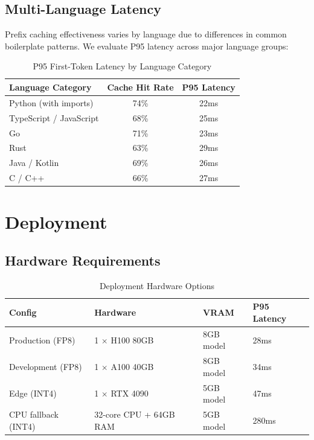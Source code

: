 \documentclass[11pt,a4paper]{article}
\begin{document}
\subsection{Multi-Language Latency}

Prefix caching effectiveness varies by language due to differences in common boilerplate patterns. We evaluate P95 latency across major language groups:

\begin{table}[H]
\centering
\caption{P95 First-Token Latency by Language Category}
\begin{tabular}{lcc}
\toprule
\textbf{Language Category} & \textbf{Cache Hit Rate} & \textbf{P95 Latency} \\
\midrule
Python (with imports) & 74\% & 22ms \\
TypeScript / JavaScript & 68\% & 25ms \\
Go & 71\% & 23ms \\
Rust & 63\% & 29ms \\
Java / Kotlin & 69\% & 26ms \\
C / C++ & 66\% & 27ms \\
\bottomrule
\end{tabular}
\end{table}

\section{Deployment}

\subsection{Hardware Requirements}

\begin{table}[H]
\centering
\caption{Deployment Hardware Options}
\begin{tabular}{llll}
\toprule
\textbf{Config} & \textbf{Hardware} & \textbf{VRAM} & \textbf{P95 Latency} \\
\midrule
Production (FP8) & 1 $\times$ H100 80GB & 8GB model & 28ms \\
Development (FP8) & 1 $\times$ A100 40GB & 8GB model & 34ms \\
Edge (INT4) & 1 $\times$ RTX 4090 & 5GB model & 47ms \\
CPU fallback (INT4) & 32-core CPU + 64GB RAM & 5GB model & 280ms \\
\bottomrule
\end{tabular}
\end{table}
\end{document}
